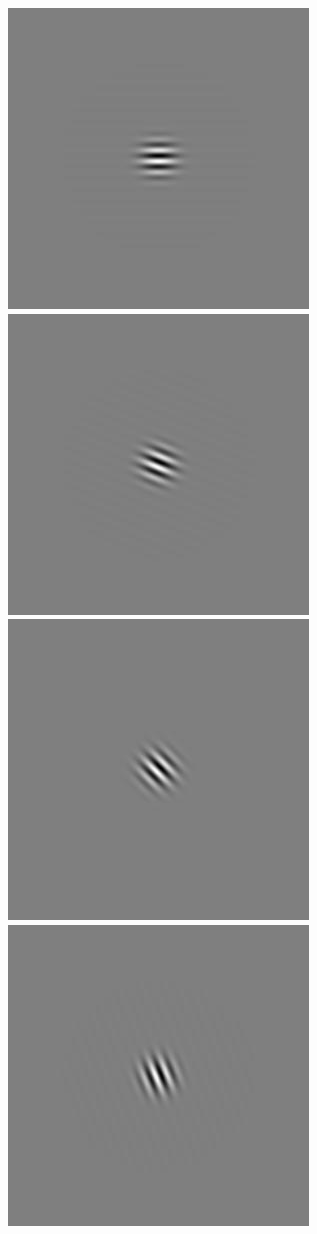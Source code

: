 \begin{figure}
\begin{center}
 \includegraphics[scale=0.1]{ch4/figures/rGabor2_4.jpg}
 \includegraphics[scale=0.1]{ch4/figures/rGabor2_5.jpg}
 \includegraphics[scale=0.1]{ch4/figures/rGabor2_6.jpg}
 \includegraphics[scale=0.1]{ch4/figures/rGabor2_7.jpg}\\

\end{center}
\end{figure}
